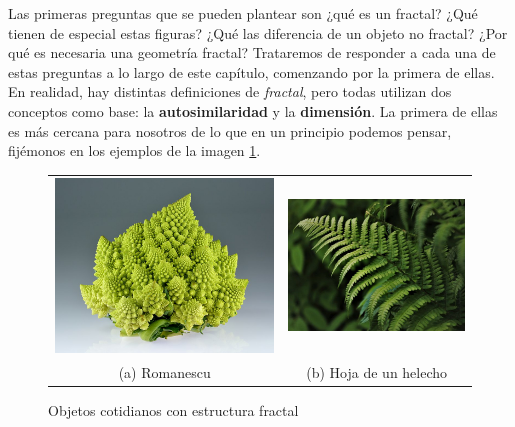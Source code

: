 


Las primeras preguntas que se pueden plantear son ¿qué es un fractal? ¿Qué tienen de especial estas figuras? ¿Qué las diferencia de un objeto no fractal? ¿Por qué es necesaria una geometría fractal? Trataremos de responder a cada una de estas preguntas a lo largo de este capítulo, comenzando por la primera de ellas. En realidad, hay distintas definiciones de \textit{fractal}, pero todas utilizan dos conceptos como base: la \textbf{autosimilaridad} y la \textbf{dimensión}. La primera de ellas es más cercana para nosotros de lo que en un principio podemos pensar, fijémonos en los ejemplos de la imagen \ref{fig:objetos}. 

\begin{figure}[h]
\begin{tabular}{cc}
  \includegraphics[scale=0.24]{./img/romanescu.jpg} &   \includegraphics[scale=0.28]{./img/helecho.jpg} \\
(a) Romanescu & (b) Hoja de un helecho \\[6pt]
\end{tabular}
\caption{Objetos cotidianos con estructura fractal}
\label{fig:objetos}
\end{figure}

